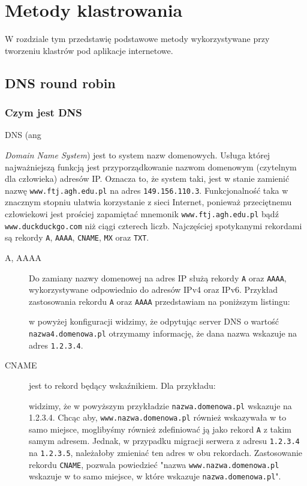 \chapter{Metody klastrowania}
\label{ch:metody_klastrowania}
W rozdziale tym przedstawię podstawowe metody wykorzystywane przy tworzeniu klastrów pod aplikacje internetowe.
\section{DNS round robin}
\label{sec:dns}
\subsection{Czym jest DNS}
DNS (ang {\textit{Domain Name System}) jest to system nazw domenowych. Usługa której najważniejszą funkcją jest przyporządkowanie nazwom domenowym (czytelnym dla człowieka) adresów IP.
Oznacza to, że system taki, jest w stanie zamienić nazwę \texttt{www.ftj.agh.edu.pl} na adres \texttt{149.156.110.3}.
Funkcjonalność taka w znacznym stopniu ułatwia korzystanie z sieci Internet, ponieważ przeciętnemu człowiekowi jest prościej zapamiętać mnemonik \texttt{www.ftj.agh.edu.pl} bądź \texttt{www.duckduckgo.com} niż ciągi czterech liczb.
Najczęściej spotykanymi rekordami są rekordy \texttt{A}, \texttt{AAAA}, \texttt{CNAME}, \texttt{MX} oraz \texttt{TXT}.
\begin{description}
\item[A, AAAA] Do zamiany nazwy domenowej na adres IP służą rekordy \texttt{A} oraz \texttt{AAAA}, wykorzystywane odpowiednio do adresów IPv4 oraz IPv6.
Przykład zastosowania rekordu \texttt{A} oraz \texttt{AAAA} przedstawiam na poniższym listingu:

w powyżej konfiguracji widzimy, że odpytując server DNS o wartość \texttt{nazwa4.domenowa.pl} otrzymamy informację, że dana nazwa wskazuje na adres \texttt{1.2.3.4}.\\
\item[CNAME] jest to rekord będący wskaźnikiem. Dla przykładu:

widzimy, że w powyższym przykładzie \texttt{nazwa.domenowa.pl} wskazuje na 1.2.3.4.
Chcąc aby, \texttt{www.nazwa.domenowa.pl} również wskazywała w to samo miejsce, moglibyśmy również zdefiniować ją jako rekord \texttt{A} z takim samym adresem.
Jednak, w przypadku migracji serwera z adresu \texttt{1.2.3.4} na \texttt{1.2.3.5}, należałoby zmieniać ten adres w obu rekordach.
Zastosowanie rekordu \texttt{CNAME}, pozwala powiedzieć "nazwa \texttt{www.nazwa.domenowa.pl} wskazuje w to samo miejsce, w które wskazuje \texttt{nazwa.domenowa.pl}".

\end{description}}
